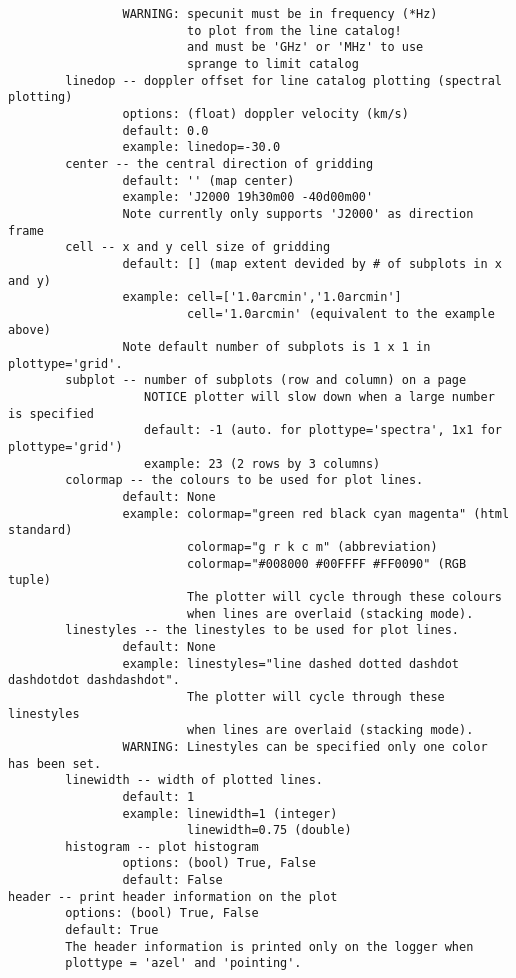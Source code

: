 \begin{verbatim}
                WARNING: specunit must be in frequency (*Hz)
                         to plot from the line catalog!
                         and must be 'GHz' or 'MHz' to use
                         sprange to limit catalog
        linedop -- doppler offset for line catalog plotting (spectral plotting)
                options: (float) doppler velocity (km/s)
                default: 0.0
                example: linedop=-30.0
        center -- the central direction of gridding
                default: '' (map center)
                example: 'J2000 19h30m00 -40d00m00'
                Note currently only supports 'J2000' as direction frame
        cell -- x and y cell size of gridding
                default: [] (map extent devided by # of subplots in x and y)
                example: cell=['1.0arcmin','1.0arcmin']
                         cell='1.0arcmin' (equivalent to the example above)
                Note default number of subplots is 1 x 1 in plottype='grid'.
        subplot -- number of subplots (row and column) on a page
                   NOTICE plotter will slow down when a large number is specified
                   default: -1 (auto. for plottype='spectra', 1x1 for plottype='grid')
                   example: 23 (2 rows by 3 columns)
        colormap -- the colours to be used for plot lines. 
                default: None
                example: colormap="green red black cyan magenta" (html standard)
                         colormap="g r k c m" (abbreviation)
                         colormap="#008000 #00FFFF #FF0090" (RGB tuple)
                         The plotter will cycle through these colours 
                         when lines are overlaid (stacking mode).
        linestyles -- the linestyles to be used for plot lines. 
                default: None
                example: linestyles="line dashed dotted dashdot dashdotdot dashdashdot". 
                         The plotter will cycle through these linestyles 
                         when lines are overlaid (stacking mode). 
                WARNING: Linestyles can be specified only one color has been set. 
        linewidth -- width of plotted lines. 
                default: 1
                example: linewidth=1 (integer)
                         linewidth=0.75 (double)
        histogram -- plot histogram
                options: (bool) True, False
                default: False
header -- print header information on the plot
        options: (bool) True, False
        default: True
        The header information is printed only on the logger when 
        plottype = 'azel' and 'pointing'. 

\end{verbatim}
